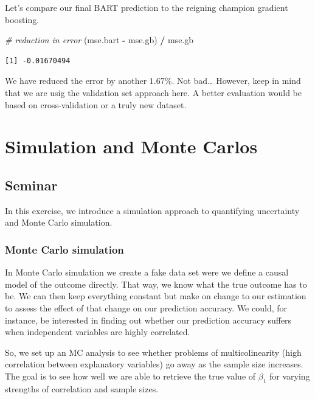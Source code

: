 \documentclass[]{article}
\newenvironment{Shaded}{\begin{snugshade}}{\end{snugshade}}
\newcommand{\CommentTok}[1]{\textcolor[rgb]{0.56,0.35,0.01}{\textit{#1}}}
\newcommand{\NormalTok}[1]{#1}
\newcommand{\OperatorTok}[1]{\textcolor[rgb]{0.81,0.36,0.00}{\textbf{#1}}}
\newcommand{\StringTok}[1]{\textcolor[rgb]{0.31,0.60,0.02}{#1}}
\begin{document}
Let's compare our final BART prediction to the reigning champion gradient boosting.

\begin{Shaded}
\begin{Highlighting}[]
\CommentTok{# reduction in error}
\NormalTok{(mse.bart }\OperatorTok{-}\StringTok{ }\NormalTok{mse.gb) }\OperatorTok{/}\StringTok{ }\NormalTok{mse.gb}
\end{Highlighting}
\end{Shaded}

\begin{verbatim}
[1] -0.01670494
\end{verbatim}

We have reduced the error by another \(1.67\%\). Not bad\ldots{} However, keep in mind that we are usig the validation set approach here. A better evaluation would be based on cross-validation or a truly new dataset.

\hypertarget{simulation-and-monte-carlos}{%
\section{Simulation and Monte Carlos}\label{simulation-and-monte-carlos}}

\hypertarget{seminar-6}{%
\subsection{Seminar}\label{seminar-6}}

In this exercise, we introduce a simulation approach to quantifying uncertainty and Monte Carlo simulation.

\hypertarget{monte-carlo-simulation}{%
\subsubsection{Monte Carlo simulation}\label{monte-carlo-simulation}}

In Monte Carlo simulation we create a fake data set were we define a causal model of the outcome directly. That way, we know what the true outcome has to be. We can then keep everything constant but make on change to our estimation to assess the effect of that change on our prediction accuracy. We could, for instance, be interested in finding out whether our prediction accuracy suffers when independent variables are highly correlated.

So, we set up an MC analysis to see whether problems of multicolinearity (high correlation between explanatory variables) go away as the sample size increases. The goal is to see how well we are able to retrieve the true value of \(\beta_{1}\) for varying strengths of correlation and sample sizes.
\end{document}
